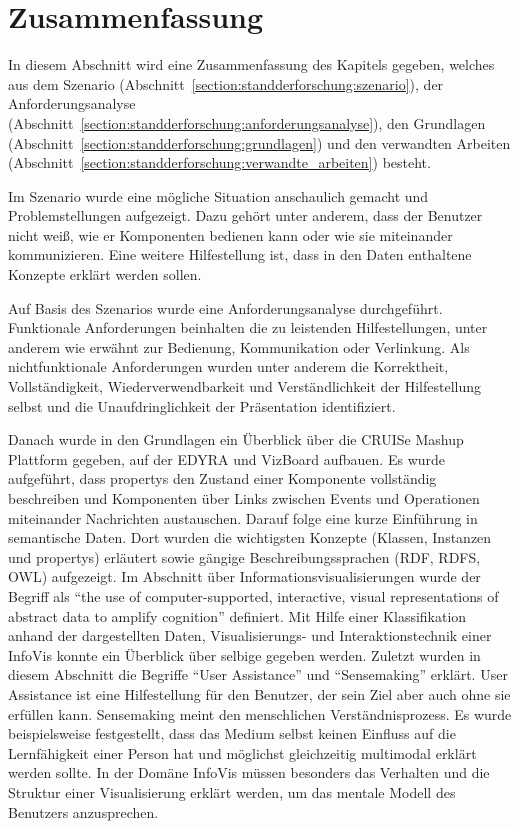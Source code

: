 \documentclass[
	headsepline,
	footsepline,
	fontsize=12pt,
	bibliography=totoc
]{scrbook}
\begin{document}
\section{Zusammenfassung}
\label{section:standderforschung:zusammenfassung}

In diesem Abschnitt wird eine Zusammenfassung des Kapitels gegeben, welches aus dem Szenario (Abschnitt~\ref{section:standderforschung:szenario}), der Anforderungsanalyse (Abschnitt~\ref{section:standderforschung:anforderungsanalyse}), den Grundlagen (Abschnitt~\ref{section:standderforschung:grundlagen}) und den verwandten Arbeiten (Abschnitt~\ref{section:standderforschung:verwandte_arbeiten}) besteht.


Im Szenario wurde eine mögliche Situation anschaulich gemacht und Problemstellungen aufgezeigt. Dazu gehört unter anderem, dass der Benutzer nicht weiß, wie er Komponenten bedienen kann oder wie sie miteinander kommunizieren. Eine weitere Hilfestellung ist, dass in den Daten enthaltene Konzepte erklärt werden sollen. 


Auf Basis des Szenarios wurde eine Anforderungsanalyse durchgeführt. Funktionale Anforderungen beinhalten die zu leistenden Hilfestellungen, unter anderem wie erwähnt zur Bedienung, Kommunikation oder Verlinkung. Als nichtfunktionale Anforderungen wurden unter anderem die Korrektheit, Vollständigkeit, Wiederverwendbarkeit und Verständlichkeit der Hilfestellung selbst und die Unaufdringlichkeit der Präsentation identifiziert.


Danach wurde in den Grundlagen ein Überblick über die CRUISe Mashup Plattform gegeben, auf der EDYRA und VizBoard aufbauen. Es wurde aufgeführt, dass propertys den Zustand einer Komponente vollständig beschreiben und Komponenten über Links zwischen Events und Operationen miteinander Nachrichten austauschen. Darauf folge eine kurze Einführung in semantische Daten. Dort wurden die wichtigsten Konzepte (Klassen, Instanzen und propertys) erläutert sowie gängige Beschreibungssprachen (RDF, RDFS, OWL) aufgezeigt. Im Abschnitt über Informationsvisualisierungen wurde der Begriff als \enquote{the use of computer-supported, interactive, visual representations of abstract data to amplify cognition} definiert. Mit Hilfe einer Klassifikation anhand der dargestellten Daten, Visualisierungs- und Interaktionstechnik einer InfoVis konnte ein Überblick über selbige gegeben werden. Zuletzt wurden in diesem Abschnitt die Begriffe \enquote{User Assistance} und \enquote{Sensemaking} erklärt. User Assistance ist eine Hilfestellung für den Benutzer, der sein Ziel aber auch ohne sie erfüllen kann. Sensemaking meint den menschlichen Verständnisprozess. Es wurde beispielsweise festgestellt, dass das Medium selbst keinen Einfluss auf die Lernfähigkeit einer Person hat und möglichst gleichzeitig multimodal erklärt werden sollte. In der Domäne InfoVis müssen besonders das Verhalten und die Struktur einer Visualisierung erklärt werden, um das mentale Modell des Benutzers anzusprechen.
\end{document}
